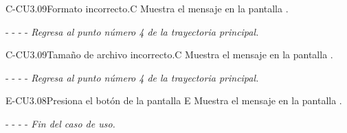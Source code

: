 	
	\begin{UCtrayectoriaA}{C-CU3.09}{Formato incorrecto.}{C}
	    \UCpaso[\UCsist]Muestra el mensaje  en la pantalla .
	    \item[- -] - - {\em Regresa al punto número 4 de la trayectoria principal.}
	\end{UCtrayectoriaA}

	\begin{UCtrayectoriaA}{C-CU3.09}{Tamaño de archivo incorrecto.}{C}
	    \UCpaso[\UCsist]Muestra el mensaje  en la pantalla .
	    \item[- -] - - {\em Regresa al punto número 4 de la trayectoria principal.}
	\end{UCtrayectoriaA}
	
    
	\begin{UCtrayectoriaA}{E-CU3.08}{Presiona el botón  de la pantalla }{E}
		\UCpaso[\UCsist] Muestra el mensaje  en la pantalla .
		\item[- -] - - {\em Fin del caso de uso.} 
	\end{UCtrayectoriaA}


 